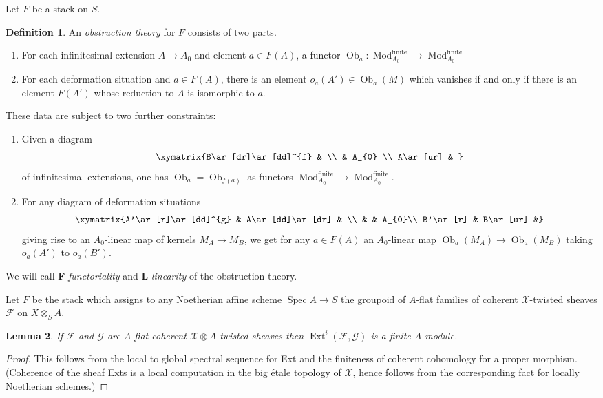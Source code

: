 \documentclass[11pt]{amsart}
\newcommand{\ms}[1]{\mathscr #1}
\newcommand{\spec}{\operatorname{Spec}}
\DeclareMathOperator{\ob}{\operatorname{Ob}}
\newcommand{\finitemod}{\operatorname{Mod}^{\operatorname{finite}}}
\DeclareMathOperator{\ext}{\operatorname{Ext}}
\renewcommand{\[}{[\!\hspace{0.03em}[}
\renewcommand{\]}{]\!\hspace{0.03em}]}
\renewcommand{\(}{(\!\hspace{0.03em}(}
\renewcommand{\)}{)\!\hspace{0.03em})}
\DeclareMathOperator*{\tensor}{\otimes}
\newtheorem{lem}{Lemma}[subsubsection]%
\theoremstyle{definition}
\newtheorem{defn}[lem]{Definition}
\theoremstyle{remark}
\begin{document}
Let $F$ be a stack on $S$.
\begin{defn} An \emph{obstruction theory\/} for $F$ consists of two 
parts.
\begin{enumerate}
    \item[(i)] For each infinitesimal extension $A\to A_{0}$ and 
    element $a\in F(A)$, a functor 
    $\ob_{a}:\operatorname{Mod}_{A_{0}}^{\operatorname{finite}}\to\operatorname{Mod}_{A_{0}}^{\operatorname{finite}}$

    \item[(ii)] For each deformation situation and $a\in F(A)$, there 
    is an element $o_{a}(A')\in\ob_{a}(M)$ which vanishes if and only 
    if there is an element $F(A')$ whose reduction to $A$ is 
    isomorphic to $a$.
\end{enumerate}
These data are subject to two further constraints:
\begin{enumerate}
    \item[\bf F:] Given a diagram 
    $$\xymatrix{B\ar[dr]\ar[dd]^{f} &  \\ & A_{0} \\
		A\ar[ur] & }$$
    of infinitesimal extensions, one has $\ob_{a}=\ob_{f(a)}$ as functors 
    $\finitemod_{A_{0}}\to\finitemod_{A_{0}}$.
    \item[\bf L:] For any diagram of deformation situations
    $$\xymatrix{A'\ar[r]\ar[dd]^{g} & A\ar[dd]\ar[dr] & \\ & & A_{0}\\
		B'\ar[r] & B\ar[ur] &}$$
    giving rise to an $A_{0}$-linear map of kernels $M_{A}\to M_{B}$, we get 
    for any $a\in F(A)$ an $A_{0}$-linear map 
    $\ob_{a}(M_{A})\to\ob_{a}(M_{B})$ taking $o_{a}(A')$ to $o_{a}(B')$.            
\end{enumerate}
We will call {\bf F} \emph{functoriality\/} and {\bf L} 
\emph{linearity\/} of the obstruction theory.
\end{defn}
Let $F$ be the stack which assigns to any Noetherian affine scheme $\spec A\to 
S$ the groupoid of $A$-flat families of coherent $\ms X$-twisted 
sheaves $\ms F$ on $X\tensor_{S}A$.
\begin{lem}\label{L:finite coho} If $\ms F$ and $\ms G$ are $A$-flat coherent $\ms 
X\tensor A$-twisted 
sheaves then $\ext^{i}(\ms F,\ms G)$ is a finite $A$-module.
\end{lem}
\begin{proof} This follows from the local to global spectral sequence 
for Ext and the finiteness of coherent cohomology for a proper 
morphism.  (Coherence of the sheaf Exts is a local computation in the 
big \'etale topology of $\ms X$, hence follows from the 
corresponding fact for locally Noetherian schemes.)
\end{proof}
\end{document}
